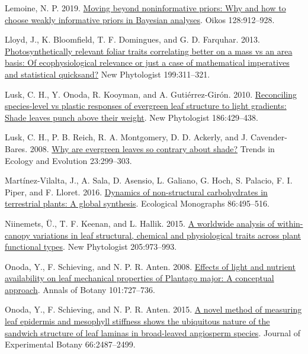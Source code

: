 \documentclass[
  12pt,
  a4paper,
,tablecaptionabove
]{scrartcl}
\newlength{\cslhangindent}
\newenvironment{CSLReferences}[2] %
 {%
  \setlength{\parindent}{0pt}
  \ifodd #1 \everypar{\setlength{\hangindent}{\cslhangindent}}\ignorespaces\fi
  \ifnum #2 > 0
  \setlength{\parskip}{#2\baselineskip}
  \fi
 }%
 {}
\begin{document}
\begin{CSLReferences}{1}{0}
\leavevmode{}%
Lemoine, N. P. 2019. \href{https://doi.org/10.1111/oik.05985}{Moving
beyond noninformative priors: Why and how to choose weakly informative
priors in {Bayesian} analyses}. Oikos 128:912--928.

\leavevmode{}%
Lloyd, J., K. Bloomfield, T. F. Domingues, and G. D. Farquhar. 2013.
\href{https://doi.org/10.1111/nph.12281}{Photosynthetically relevant
foliar traits correlating better on a mass vs an area basis: {Of}
ecophysiological relevance or just a case of mathematical imperatives
and statistical quicksand?} New Phytologist 199:311--321.

\leavevmode{}%
Lusk, C. H., Y. Onoda, R. Kooyman, and A. Gutiérrez-Girón. 2010.
\href{https://doi.org/10.1111/j.1469-8137.2010.03202.x}{Reconciling
species-level vs plastic responses of evergreen leaf structure to light
gradients: {Shade} leaves punch above their weight}. New Phytologist
186:429--438.

\leavevmode{}%
Lusk, C. H., P. B. Reich, R. A. Montgomery, D. D. Ackerly, and J.
Cavender-Bares. 2008.
\href{https://doi.org/10.1016/j.tree.2008.02.006}{Why are evergreen
leaves so contrary about shade?} Trends in Ecology and Evolution
23:299--303.

\leavevmode{}%
Martínez-Vilalta, J., A. Sala, D. Asensio, L. Galiano, G. Hoch, S.
Palacio, F. I. Piper, and F. Lloret. 2016.
\href{https://doi.org/10.1002/ecm.1231}{Dynamics of non-structural
carbohydrates in terrestrial plants: A global synthesis}. Ecological
Monographs 86:495--516.

\leavevmode{}%
Niinemets, Ü., T. F. Keenan, and L. Hallik. 2015.
\href{https://doi.org/10.1111/nph.13096}{A worldwide analysis of
within-canopy variations in leaf structural, chemical and physiological
traits across plant functional types}. New Phytologist 205:973--993.

\leavevmode{}%
Onoda, Y., F. Schieving, and N. P. R. Anten. 2008.
\href{https://doi.org/10.1093/aob/mcn013}{Effects of light and nutrient
availability on leaf mechanical properties of {Plantago} major: {A}
conceptual approach}. Annals of Botany 101:727--736.

\leavevmode{}%
Onoda, Y., F. Schieving, and N. P. R. Anten. 2015.
\href{https://doi.org/10.1093/jxb/erv024}{A novel method of measuring
leaf epidermis and mesophyll stiffness shows the ubiquitous nature of
the sandwich structure of leaf laminas in broad-leaved angiosperm
species}. Journal of Experimental Botany 66:2487--2499.


\end{CSLReferences}
\end{document}
